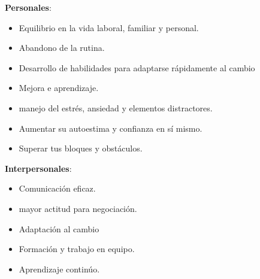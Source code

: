 \textbf{Personales}:

      \begin{itemize}
      \item Equilibrio en la vida laboral, familiar y personal.
      \item Abandono de la rutina.
      \item Desarrollo de habilidades para adaptarse rápidamente al cambio
      \item Mejora e aprendizaje.
      \item manejo del estrés, ansiedad y elementos distractores.
      \item Aumentar su autoestima y confianza en sí mismo.
      \item Superar tus bloques y obstáculos.
      \end{itemize}
      
\textbf{Interpersonales}:
\begin{itemize}
\item Comunicación eficaz.
\item mayor actitud para negociación.
\item Adaptación al cambio
\item Formación y trabajo en equipo.
\item Aprendizaje continúo.
\end{itemize}

